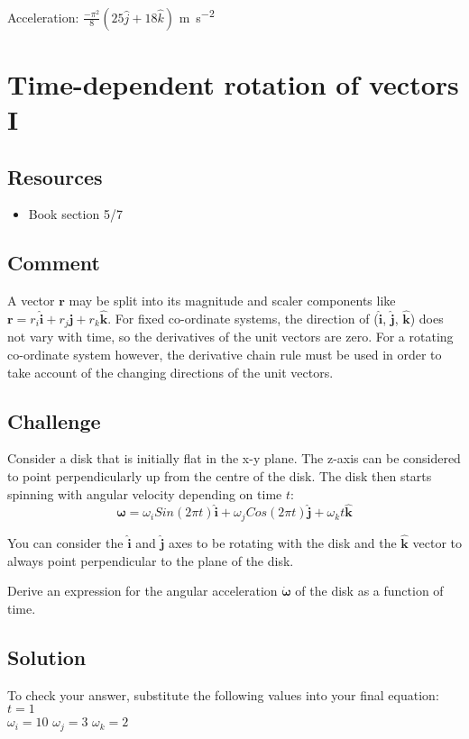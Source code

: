 Acceleration: $\frac{-\pi^2}{8}(25 \hat{j} + 18 \hat{k})$ \si{\meter\per\square\second}




\newpage
\section{Time-dependent rotation of vectors I}

\subsection*{Resources}
\begin{itemize}
    \item Book section 5/7
\end{itemize}

\subsection*{Comment}
A vector $\bm{r}$ may be split into its magnitude and scaler components like $\bm{r} = r_i \bm{\hat{i}} + r_j \bm{\hat{j}} + r_k \bm{\hat{k}}$. For fixed co-ordinate systems, the direction of ($\bm{\hat{i}}$, $\bm{\hat{j}}$, $\bm{\hat{k}}$) does not vary with time, so the derivatives of the unit vectors are zero. For a rotating co-ordinate system however, the derivative chain rule must be used in order to take account of the changing directions of the unit vectors.

\subsection*{Challenge}
Consider a disk that is initially flat in the x-y plane. The z-axis can be considered to point perpendicularly up from the centre of the disk. The disk then starts spinning with angular velocity depending on time $t$:
\begin{equation}
    \bm{\omega} = \omega_i Sin(2 \pi t) \bm{\hat{i}} + \omega_j Cos(2 \pi t) \bm{\hat{j}} + \omega_k t \bm{\hat{k}}
\end{equation}

You can consider the $\bm{\hat{i}}$ and $\bm{\hat{j}}$ axes to be rotating with the disk and the $\bm{\hat{k}}$ vector to always point perpendicular to the plane of the disk. 

Derive an expression for the angular acceleration $\bm{\dot{\omega}}$ of the disk as a function of time.


\subsection*{Solution}
To check your answer, substitute the following values into your final equation:
$t=1$\\
$\omega_i=10$
$\omega_j=3$
$\omega_k=2$


